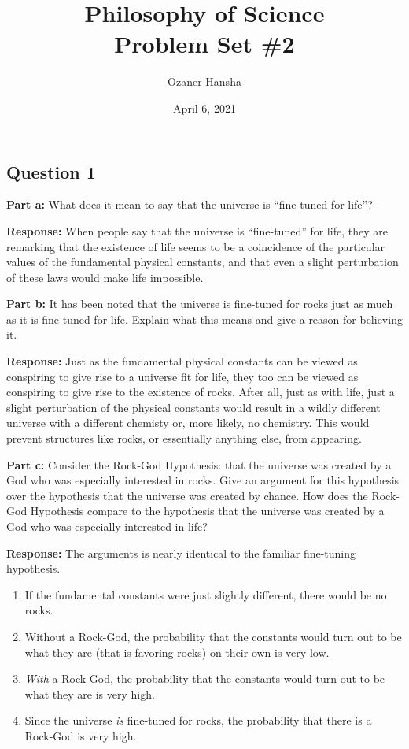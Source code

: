 \documentclass{article}
\begin{document}
\title{Philosophy of Science\\ Problem Set \#2}
\author{Ozaner Hansha}
\date{April 6, 2021}
\maketitle

\subsection*{Question 1}
\noindent\textbf{Part a:} What does it mean to say that the universe is ``fine-tuned for life''?
\bigskip

\noindent\textbf{Response:} When people say that the universe is ``fine-tuned'' for life, they are remarking that the existence of life seems to be a coincidence of the particular values of the fundamental physical constants, and that even a slight perturbation of these laws would make life impossible.
\bigskip

\noindent\textbf{Part b:} It has been noted that the universe is fine-tuned for rocks just as much as it is fine-tuned for life. Explain what this means and give a reason for believing it.
\bigskip

\noindent\textbf{Response:} Just as the fundamental physical constants can be viewed as conspiring to give rise to a universe fit for life, they too can be viewed as conspiring to give rise to the existence of rocks. After all, just as with life, just a slight perturbation of the physical constants would result in a wildly different universe with a different chemisty or, more likely, no chemistry. This would prevent structures like rocks, or essentially anything else, from appearing.
\bigskip

\noindent\textbf{Part c:} Consider the Rock-God Hypothesis: that the universe was created by a God who was especially interested in rocks. Give an argument for this hypothesis over the hypothesis that the universe was created by chance. How does the Rock-God Hypothesis compare to the hypothesis that the universe was created by a God who was especially interested in life?
\bigskip

\noindent\textbf{Response:} The arguments is nearly identical to the familiar fine-tuning hypothesis.
\begin{enumerate}
    \item If the fundamental constants were just slightly different, there would be no rocks.
    \item  Without a Rock-God, the probability that the constants would turn out to be what they are (that is favoring rocks) on their own is very low.
    \item \textit{With} a Rock-God, the probability that the constants would turn out to be what they are is very high.
    \item Since the universe \textit{is} fine-tuned for rocks, the probability that there is a Rock-God is very high.
\end{enumerate}
\end{document}
